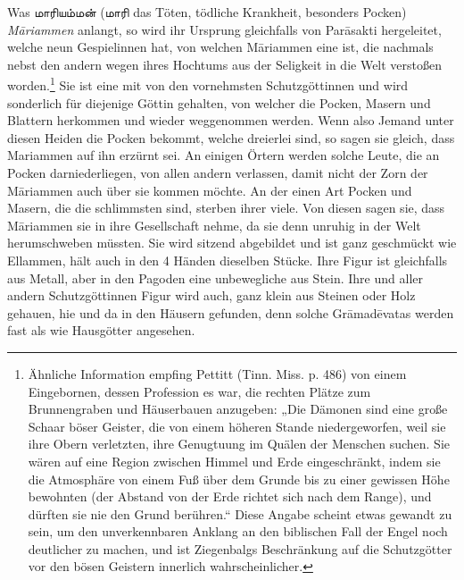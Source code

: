 \documentclass{article}
\newcommand{\TamilText}[1]{\texttamil{#1}}
\newcommand{\tam}[1]{\TamilText{#1}}
\begin{document}
Was \tam{மாரியம்மன்} (\tam{மாரி} das Töten, tödliche Krankheit, besonders Pocken) \emph{M\={a}riammen} anlangt, so wird ihr Ursprung gleichfalls von Par\={a}sakti hergeleitet, welche neun Gespielinnen hat, von welchen M\={a}riammen eine ist, die nachmals nebst den andern wegen ihres Hochtums aus der Seligkeit in die Welt verstoßen worden.\footnote{Ähnliche Information empfing Pettitt (Tinn. Miss. p. 486) von einem Eingebornen, dessen Profession es war, die rechten Plätze zum Brunnengraben und Häuserbauen anzugeben: „Die Dämonen sind eine große Schaar böser Geister, die von einem höheren Stande niedergeworfen, weil sie ihre Obern verletzten, ihre Genugtuung im Quälen der Menschen suchen. Sie wären auf eine Region zwischen Himmel und Erde eingeschränkt, indem sie die Atmosphäre von einem Fuß über dem Grunde bis zu einer gewissen Höhe bewohnten (der Abstand von der Erde richtet sich nach dem Range), und dürften sie nie den Grund berühren.“ Diese Angabe scheint etwas gewandt zu sein, um den unverkennbaren Anklang an den biblischen Fall der Engel noch deutlicher zu machen, und ist Ziegenbalgs Beschränkung auf die Schutzgötter vor den bösen Geistern innerlich wahrscheinlicher.} Sie ist eine mit von den vornehmsten Schutzgöttinnen und wird sonderlich für diejenige Göttin gehalten, von welcher die Pocken, Masern und Blattern herkommen und wieder weggenommen werden. Wenn also Jemand unter diesen Heiden die Pocken bekommt, welche dreierlei sind, so sagen sie gleich, dass Mariammen auf ihn erzürnt sei. An einigen Örtern werden solche Leute, die an Pocken darniederliegen, von allen andern verlassen, damit nicht der Zorn der M\={a}riammen auch über sie kommen möchte. An der einen Art Pocken und Masern, die die schlimmsten sind, sterben ihrer viele. Von diesen sagen sie, dass M\={a}riammen sie in ihre Gesellschaft nehme, da sie denn unruhig in der Welt herumschweben müssten. Sie wird sitzend abgebildet und ist ganz geschmückt wie Ellammen, hält auch in den 4 Händen dieselben Stücke. Ihre Figur ist gleichfalls aus Metall, aber in den Pagoden eine unbewegliche aus Stein. Ihre und aller andern Schutzgöttinnen Figur wird auch, ganz klein aus Steinen oder Holz gehauen, hie und da in den Häusern gefunden, denn solche Gr\={a}mad\={e}vatas werden fast als wie Hausgötter angesehen.
\end{document}

